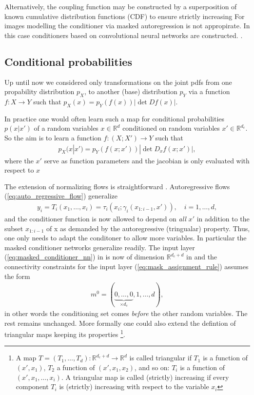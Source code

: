 \documentclass[12pt,a4paper]{article}
\begin{document}
Alternatively, the coupling function may be constructed by a superposition of known cumulative distribution functions (CDF) to ensure strictly increasing  For images modelling the conditioner via masked autoregression is not appropirate. In this case conditioners based on convolutional neural networks are constructed. \cite{ho_2019_flow_pp}. 

\subsection{Conditional probabilities}
Up until now we considered only transformations on the joint pdfs from one propability distribution $p_X$, to another (base) distribution $p_Y$ via a function $f: X\rightarrow Y$ such that $p_X(x) = p_Y(f(x)) |\det Df(x)|$. 


In practice one would often learn such a map for conditional probabilities $p(x|x')$ of a random variables $x\in\mathbb{R}^d$ conditioned on random variables $x' \in \mathbb{R}^{d_c}$. So the aim is to learn a function $f: (X;X') \rightarrow Y$ such that
\begin{align}
p_X(x|x') = p_Y(f(x;x')) |\det D_xf(x;x')| \label{eq:pdf_trafo_inv}, 
\end{align}
where the $x'$ serve as function parameters and the jacobian is only evaluated with respect to $x$


The extension of normalizing flows is straightforward  
\cite{papamakarios_2017_maf}. Autoregressive flows (\ref{eq:auto_regressive_flow}) generalize
\begin{align} 
y_i =T_i(x_1,\dots, x_i) = \tau_i(x_i; \gamma_i(x_{1:i-1}, x')), \quad i=1,\dots,d, 
\end{align} 
and the conditioner function is now allowed to depend on \textit{all} $x'$ in addition to the subset $x_{1:i-1}$ of x as demanded by the autoregressive (tringualar) property. Thus, one only needs to adapt the conditoner to allow more variables. In particular the masked conditioner networks generalize readily. The input layer (\ref{eq:masked_conditioner_nn}) in is now of dimension $\mathbb{R}^{d_c + d}$ in 
and the connectivity constraints for the input layer (\ref{eq:mask_assignment_rule}) assumes the form 
\begin{align}
	m^0  = (\underbrace{0, \dots, 0}_{\times d_c}, 1, \dots, d),
\end{align}
in other words the conditioning set comes \textit{before} the other random variables. The rest remains unchanged. More formally one could also extend the defintion of triangular maps keeping its properties \footnote{A map $T=(T_1, \dots, T_d): \mathbb{R}^{d_c + d}  \rightarrow \mathbb{R}^d $ is called triangular if $T_1$ is a function of $(x', x_1)$, $T_2$ a function of $(x', x_1, x_2)$, and so on: $T_i$ is a function of $(x', x_1,\dots, x_i)$. A triangular map is called (strictly) increasing if every component $T_i$ is (strictly) increasing with respect to the variable $x_i$}.
\end{document}
